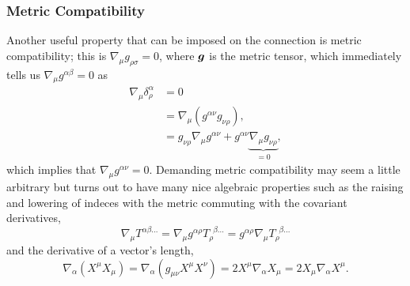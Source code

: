 \subsubsection{Metric Compatibility}
Another useful property that can be imposed on the connection is metric compatibility; this is $\nabla_\mu g_{\rho\sigma}=0$, where $\boldsymbol{g}$ is the metric tensor, which immediately tells us $\nabla_\mu g^{\alpha\beta}=0$ as 
\begin{align}
\nabla_\mu \delta^\alpha_\rho &= 0 \\ 
&=  \nabla_\mu(g^{\alpha \nu}g_{\nu \rho}) ,\\
&= g_{\nu \rho}\nabla_\mu g^{\alpha \nu} + g^{\alpha \nu}\underbrace{\nabla_\mu g_{\nu \rho}}_{=0},
\end{align}
which implies that $\nabla_\mu g^{\alpha\nu}=0$. Demanding metric compatibility may seem a little arbitrary but turns out to have many nice algebraic properties such as the raising and lowering of indeces with the metric commuting with the covariant derivatives,
\begin{equation} \nabla_{\mu} T^{\alpha \beta ...} = \nabla_\mu g^{\alpha\rho}T_{\rho}^{\,\,\,\beta ...} = g^{\alpha\rho} \nabla_\mu T_{\rho}^{\,\,\,\beta ...} \end{equation}
and the derivative of a vector's length,
\begin{equation}
\nabla_\alpha (X^\mu X_\mu) = \nabla_\alpha (g_{\mu\nu}X^\mu X^\nu) = 2 X^\mu \nabla_\alpha X_\mu = 2 X_\mu \nabla_\alpha X^\mu.
\end{equation}


